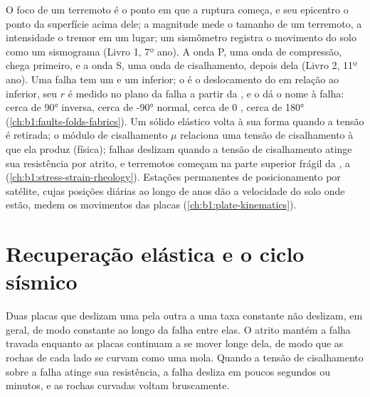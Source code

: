 \begin{recall}
O foco de um terremoto é o ponto em que a ruptura começa, e seu epicentro o ponto da superfície acima dele; a magnitude mede o tamanho de um terremoto, a intensidade o tremor em um lugar; um sismômetro registra o movimento do solo como um sismograma (Livro 1, 7º ano). A onda P, uma onda de compressão, chega primeiro, e a onda S, uma onda de cisalhamento, depois dela (Livro 2, 11º ano). Uma falha tem um  e um inferior; o  é o deslocamento do  em relação ao inferior, seu  $r$ é medido no plano da falha a partir da , e o  dá o nome à falha: cerca de \ang{90} inversa, cerca de \ang{-90} normal, cerca de 0 , cerca de \ang{180}  (\cref{ch:b1:faults-folds-fabrics}). Um sólido elástico volta à sua forma quando a tensão é retirada; o módulo de cisalhamento $\mu$ relaciona uma tensão de cisalhamento à  que ela produz (física); falhas deslizam quando a tensão de cisalhamento atinge sua resistência por atrito, e terremotos começam na parte superior frágil da , a  (\cref{ch:b1:stress-strain-rheology}). Estações permanentes de posicionamento por satélite, cujas posições diárias ao longo de anos dão a velocidade do solo onde estão, medem os movimentos das placas (\cref{ch:b1:plate-kinematics}).
\end{recall}

\section{Recuperação elástica e o ciclo sísmico}\label{sec:b1:earthquake-source:cycle}

Duas placas que deslizam uma pela outra a uma taxa constante não deslizam, em geral, de modo constante ao longo da falha entre elas. O atrito mantém a falha travada enquanto as placas continuam a se mover longe dela, de modo que as rochas de cada lado se curvam como uma mola. Quando a tensão de cisalhamento sobre a falha atinge sua resistência, a falha desliza em poucos segundos ou minutos, e as rochas curvadas voltam bruscamente.

